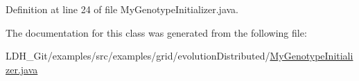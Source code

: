 Definition at line 24 of file My\-Genotype\-Initializer.\-java.



The documentation for this class was generated from the following file\-:\begin{DoxyCompactItemize}
\item 
L\-D\-H\-\_\-\-Git/examples/src/examples/grid/evolution\-Distributed/\hyperlink{evolution_distributed_2_my_genotype_initializer_8java}{My\-Genotype\-Initializer.\-java}\end{DoxyCompactItemize}
